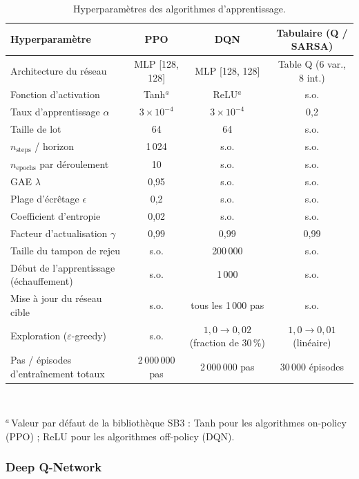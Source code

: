 \documentclass[11pt,a4paper]{article}
\newif\ifrevmarks
\newcommand{\revtag}[1]{\ifrevmarks\textsuperscript{\textcolor{red!70!black}{\scriptsize[#1]}}\fi}
\newcommand{\rev}[2]{\ifrevmarks{\color{revcolor}#2}\revtag{#1}\else#2\fi}
\begin{document}
\begin{table}[H]
\centering
\caption{Hyperparamètres des algorithmes d'apprentissage.}
\label{tab:hyper}
\footnotesize
\setlength{\tabcolsep}{5pt}
\begin{tabular}{lccc}
\toprule
\textbf{Hyperparamètre} & \textbf{PPO} & \textbf{DQN} & \textbf{Tabulaire (Q / SARSA)} \\
\midrule
Architecture du réseau         & MLP [128, 128] & MLP [128, 128] & \rev{M8}{Table Q (6 var., 8 int.)} \\
Fonction d'activation          & Tanh$^{a}$     & ReLU$^{a}$     & s.o. \\
Taux d'apprentissage $\alpha$  & $3\times10^{-4}$ & $3\times10^{-4}$ & 0,2   \\
Taille de lot                  & 64             & 64             & s.o. \\
$n_{\mathrm{steps}}$ / horizon & 1\,024         & s.o. & s.o. \\
$n_{\mathrm{epochs}}$ par déroulement & 10      & s.o. & s.o. \\
GAE $\lambda$                  & 0,95           & s.o. & s.o. \\
Plage d'écrêtage $\epsilon$    & 0,2            & s.o. & s.o. \\
Coefficient d'entropie         & 0,02           & s.o. & s.o. \\
Facteur d'actualisation $\gamma$ & 0,99         & 0,99           & 0,99    \\
Taille du tampon de rejeu      & s.o. & 200\,000       & s.o. \\
Début de l'apprentissage (échauffement) & s.o. & 1\,000 & s.o. \\
Mise à jour du réseau cible    & s.o. & tous les 1\,000 pas & s.o. \\
Exploration ($\varepsilon$-greedy) & s.o. & $1{,}0\to0{,}02$ (fraction de 30\,\%) & $1{,}0\to0{,}01$ (linéaire) \\
Pas / épisodes d'entraînement totaux & 2\,000\,000 pas & 2\,000\,000 pas & 30\,000 épisodes \\
\bottomrule
\end{tabular}
\\[4pt]
\raggedright
\footnotesize $^{a}$\,Valeur par défaut de la bibliothèque SB3 : Tanh pour les algorithmes on-policy (PPO) ; ReLU pour les algorithmes off-policy (DQN).\\
\end{table}

\subsubsection{Deep Q-Network}
\end{document}
